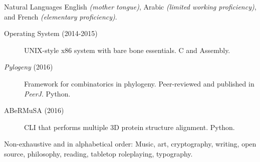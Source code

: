 \documentclass[10pt,a4paper]{article}
\begin{document}
\inlineheadsection 
{Natural Languages}
{English \textit{(mother tongue)}, Arabic \textit{(limited working proficiency)}, and French \textit{(elementary proficiency)}.}


\spacedhrule{1.6em}{-0.4em} %



\begin{description}
\item [Operating System (2014-2015)] UNIX-style x86 system with bare bone essentials. C and Assembly.
\item [\textit{Pylogeny} (2016)] Framework for combinatorics in phylogeny. Peer-reviewed and published in \textit{PeerJ}. Python.
\item [ABeRMuSA (2016)] CLI that performs multiple 3D protein structure alignment. Python.
\end{description}


\spacedhrule{1.6em}{-0.4em} %



\inlineheadsection %
{Non-exhaustive and in alphabetical order:}
{Music, art, cryptography, writing, open source, philosophy, reading, tabletop roleplaying, typography.}
\end{document}
